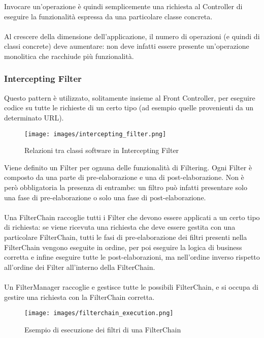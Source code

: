 Invocare un'operazione è quindi semplicemente una richiesta al Controller di eseguire la funzionalità espressa da una particolare classe concreta.\\
\\
Al crescere della dimensione dell'applicazione, il numero di operazioni (e quindi di classi concrete) deve aumentare: non deve infatti essere presente un'operazione monolitica che racchiude più funzionalità.

\subsubsection{Intercepting Filter}
Questo pattern è utilizzato, solitamente insieme al Front Controller, per eseguire codice su tutte le richieste di un certo tipo (ad esempio quelle provenienti da un determinato URL).

\begin{figure}[H]
    \centering
    \texttt{[image: images/intercepting\_filter.png]}
    \caption{Relazioni tra classi software in Intercepting Filter}
    \label{fig:intercepting_filter}
\end{figure}
Viene definito un Filter per ognuna delle funzionalità di Filtering. Ogni Filter è composto da una parte di pre-elaborazione e una di post-elaborazione. Non è però obbligatoria la presenza di entrambe: un filtro può infatti presentare solo una fase di pre-elaborazione o solo una fase di post-elaborazione.\\
\\
Una FilterChain raccoglie tutti i Filter che devono essere applicati a un certo tipo di richiesta: se viene ricevuta una richiesta che deve essere gestita con una particolare FilterChain, tutti le fasi di pre-elaborazione dei filtri presenti nella FilterChain vengono eseguite in ordine, per poi eseguire la logica di business corretta e infine eseguire tutte le post-elaborazioni, ma nell'ordine inverso rispetto all'ordine dei Filter all'interno della FilterChain.\\
\\
Un FilterManager raccoglie e gestisce tutte le possibili FilterChain, e si occupa di gestire una richiesta con la FilterChain corretta.
\begin{figure}[H]
    \centering
    \texttt{[image: images/filterchain\_execution.png]}
    \caption{Esempio di esecuzione dei filtri di una FilterChain}
    \label{fig:filterchain_execution}
\end{figure}


